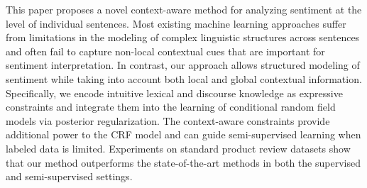 This paper proposes a novel context-aware method for analyzing sentiment at the level of individual sentences. Most existing machine learning approaches suffer from limitations in the modeling of complex linguistic structures across sentences and often fail to capture non-local contextual cues that are important for sentiment interpretation. In contrast, our approach allows structured modeling of sentiment while taking into account both local and global contextual information. Specifically, we encode intuitive lexical and discourse knowledge as expressive constraints and integrate them into the learning of conditional random field models via posterior regularization. The context-aware constraints provide additional power to the CRF model and can guide semi-supervised learning when labeled data is limited. Experiments on standard product review datasets show that our method outperforms the state-of-the-art methods in both the supervised and semi-supervised settings.
